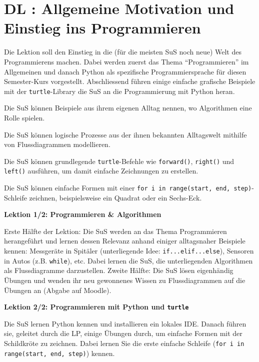 \section{DL \themycounter: Allgemeine Motivation und Einstieg ins Programmieren}

\begin{myExBox}[title=DL \themycounter]
Die Lektion soll den Einstieg in die (für die meisten SuS noch neue) Welt des Programmierens machen. Dabei werden zuerst das Thema ``Programmieren'' im Allgemeinen und danach Python als spezifische Programmiersprache für diesen Semester-Kurs vorgestellt. Abschliessend führen einige einfache grafische Beispiele mit der \lstinline|turtle|-Library die SuS an die Programmierung mit Python heran.


\begin{todolist}
    \item Die SuS können Beispiele aus ihrem eigenen Alltag nennen, wo Algorithmen eine Rolle spielen.
    \item Die SuS können logische Prozesse aus der ihnen bekannten Alltagswelt mithilfe von Flussdiagrammen modellieren.
    \item Die SuS können grundlegende \lstinline|turtle|-Befehle wie \lstinline|forward()|, \lstinline|right()| und \lstinline|left()| ausführen, um damit einfache Zeichnungen zu erstellen.
    \item Die SuS können einfache Formen mit einer \lstinline|for i in range(start, end, step)|-Schleife zeichnen, beispielsweise ein Quadrat oder ein Sechs-Eck.
\end{todolist}

\textbf{Lektion 1/2: Programmieren \& Algorithmen}

Erste Hälfte der Lektion: Die SuS werden an das Thema Programmieren herangeführt und lernen dessen Relevanz anhand einiger alltagsnaher Beispiele kennen: Messgeräte in Spitäler (unterliegende Idee: \lstinline|if...elif...else|), Sensoren in Autos (z.B. \lstinline|while|), etc. Dabei lernen die SuS, die unterliegenden Algorithmen als Flussdiagramme darzustellen. Zweite Hälfte: Die SuS lösen eigenhändig Übungen und wenden ihr neu gewonnenes Wissen zu Flussdiagrammen auf die Übungen an (Abgabe auf Moodle).

\textbf{Lektion 2/2: Programmieren mit Python und \lstinline|turtle|}

Die SuS lernen Python kennen und installieren ein lokales IDE. Danach führen sie, geleitet durch die LP, einige Übungen durch, um einfache Formen mit der Schildkröte zu zeichnen. Dabei lernen Sie die erste einfache Schleife (\lstinline|for i in range(start, end, step)|) kennen.


\end{myExBox}
